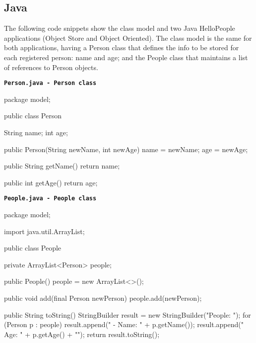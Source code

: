 \subsection{Java}
\label{sec:JavaFirstApp}

The following code snippets show the class model and two Java HelloPeople applications (Object Store and Object Oriented). The class model is the same for both applications, having a Person class that defines the info to be stored for each registered person: name and age; and the People class that maintains a list of references to Person objects.

\begin{tBox}
\texttt{\bfseries\textcolor{basecolor}{Person.java - Person class}}
\begin{java}
package model;

public class Person {
    String name;
    int age;
  
    public Person(String newName, int newAge) {
        name = newName;
        age = newAge;
    }
  
    public String getName() {
        return name;
    }
  
    public int getAge() {
        return age;
    }
}
\end{java}
\end{tBox}

\begin{tBox}
\texttt{\bfseries\textcolor{basecolor}{People.java - People class}}
\begin{java}
package model;

import java.util.ArrayList;

public class People {
    private ArrayList<Person> people;

    public People() {
        people = new ArrayList<>();
    }

    public void add(final Person newPerson) {
        people.add(newPerson);
    }

    public String toString() {
        StringBuilder result = new StringBuilder("People: \n");
        for (Person p : people) {
            result.append(" - Name: " + p.getName());
            result.append(" Age: " + p.getAge() + "\n");
        }
        return result.toString();
    }
}
\end{java}
\end{tBox}



